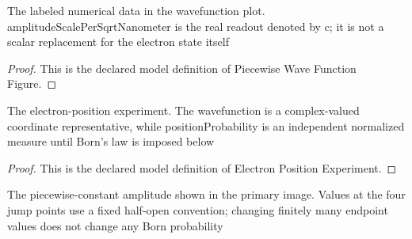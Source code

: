 \begin{definition}
  \label{def:physics:phyx-mini-0647:phyxminiproblems-problemphyxmini0647-piecewisewavefunctionfigure}
  The labeled numerical data in the wavefunction plot. amplitudeScalePerSqrtNanometer is the real readout denoted by c; it is not a scalar replacement for the electron state itself
\end{definition}
\begin{proof}
  This is the declared model definition of Piecewise Wave Function Figure.
\end{proof}
\begin{definition}
  \label{def:physics:phyx-mini-0647:phyxminiproblems-problemphyxmini0647-electronpositionexperiment}
  The electron-position experiment. The wavefunction is a complex-valued coordinate representative, while positionProbability is an independent normalized measure until Born's law is imposed below
\end{definition}
\begin{proof}
  This is the declared model definition of Electron Position Experiment.
\end{proof}
\begin{definition}
  \label{def:physics:phyx-mini-0647:phyxminiproblems-problemphyxmini0647-plottedwaveamplitudepersqrtnanometer}
  The piecewise-constant amplitude shown in the primary image. Values at the four jump points use a fixed half-open convention; changing finitely many endpoint values does not change any Born probability
\end{definition}
